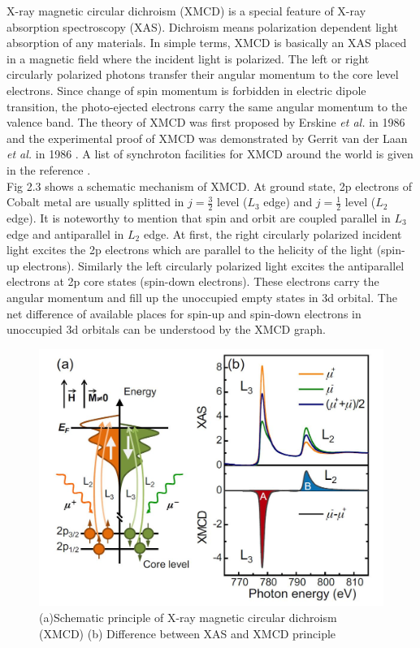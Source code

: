 \documentclass[main.tex]{subfiles}
\begin{document}
X-ray magnetic circular dichroism (XMCD) is a special feature of X-ray absorption spectroscopy (XAS). Dichroism means polarization dependent light absorption of any materials. In simple terms, XMCD is basically an XAS placed in a magnetic field where the incident light is polarized. The left or right circularly polarized photons transfer their angular momentum to the core level electrons. Since change of spin momentum is forbidden in electric dipole transition, the photo-ejected electrons carry the same angular momentum to the valence band. The theory of XMCD was first proposed by Erskine \textit{et al.} in 1986 and the experimental proof of XMCD was demonstrated by Gerrit van der Laan \textit{et al.} in 1986 \cite{erskine1975calculation, van1986experimental}. A list of synchroton facilities for XMCD around the world is given in the reference \cite{wilhelm2013magnetic}. \\

Fig 2.3 shows a schematic mechanism of XMCD. At ground state, 2p electrons of Cobalt metal are usually splitted in \(j=\frac{3}{2}\) level ($L_3$ edge) and \(j=\frac{1}{2}\) level ($L_2$ edge). It is noteworthy to mention that spin and orbit are coupled parallel in $L_3$ edge and antiparallel in $L_2$ edge. At first, the right circularly polarized incident light excites the 2p electrons which are parallel to the helicity of the light (spin-up electrons). Similarly the left circularly polarized light excites the antiparallel electrons at 2p core states (spin-down electrons). These electrons carry the angular momentum and fill up the unoccupied empty states in 3d orbital. The net difference of available places for spin-up and spin-down electrons in unoccupied 3d orbitals can be understood by the XMCD graph. 

\begin{figure}[!htb]
	\centering
	\includegraphics[width=0.85\linewidth]{xmcd}
	\caption{(a)Schematic principle of X-ray magnetic circular dichroism (XMCD) (b) Difference between XAS and XMCD principle \cite{van2014x}}
	\label{fig:TEM_PT}
\end{figure}
\FloatBarrier
\end{document}
